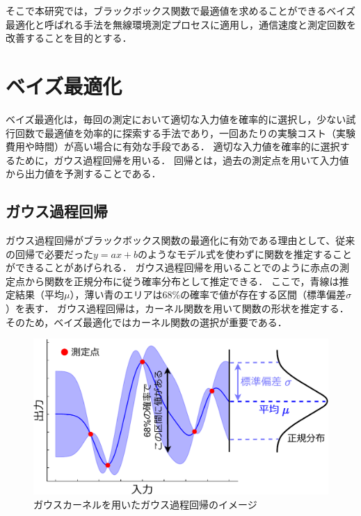 \documentclass[twocolumn]{ltjarticle}
\begin{document}
そこで本研究では，ブラックボックス関数で最適値を求めることができるベイズ最適化と呼ばれる手法を無線環境測定プロセスに適用し，通信速度と測定回数を改善することを目的とする．

\section{ベイズ最適化}

ベイズ最適化は，毎回の測定において適切な入力値を確率的に選択し，少ない試行回数で最適値を効率的に探索する手法であり，一回あたりの実験コスト（実験費用や時間）が高い場合に有効な手段である．
適切な入力値を確率的に選択するために，ガウス過程回帰を用いる．
回帰とは，過去の測定点を用いて入力値から出力値を予測することである．

\subsection{ガウス過程回帰}

ガウス過程回帰がブラックボックス関数の最適化に有効である理由として、従来の回帰で必要だった\(y=ax+b\)のようなモデル式を使わずに関数を推定することができることがあげられる．
ガウス過程回帰を用いることでのように赤点の測定点から関数を正規分布に従う確率分布として推定できる．
ここで，青線は推定結果（平均\(\mu\)），薄い青のエリアは68\%の確率で値が存在する区間（標準偏差\(\sigma\)）を表す．
ガウス過程回帰は，カーネル関数を用いて関数の形状を推定する．
そのため，ベイズ最適化ではカーネル関数の選択が重要である\cite{gaussian_process}．
\setlength\intextsep{3pt}
\setlength\textfloatsep{3pt}
\begin{figure}[htbp]
	\centering
	\includegraphics[width=0.83\linewidth]{./figures/material_5_kernel_v2.pdf}
	\vspace*{-0.3cm}
	\caption{ガウスカーネルを用いたガウス過程回帰のイメージ} \label{fig:gaussian_process}
\end{figure}
\end{document}
